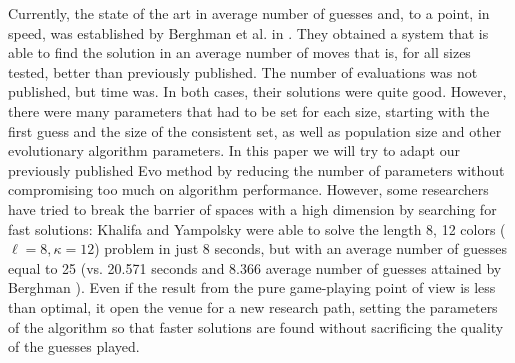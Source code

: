 \documentclass[conference]{IEEEtran}
\begin{document}
Currently, the state of the art in average number of guesses and, to a
point, in speed,
was established by Berghman et al. in \cite{Berghman20091880}. They obtained a system that is able to find the solution in an average number of moves that is, for all sizes tested, better than previously published. The number of evaluations was not published, but time was. In both cases, their solutions were
quite good. However, there were many parameters that had to be set for
each size, starting with the first guess and the size of the
consistent set, as well as population size and other evolutionary
algorithm parameters. In this paper we will try to adapt our
previously published Evo method \cite{DBLP:conf/evoW/GuervosCM11}
by reducing the number of parameters without compromising too much on algorithm performance. However, some researchers have tried to break the barrier of spaces with a high dimension by searching for fast solutions: Khalifa and Yampolsky
\cite{khalifa2011ga} were able to solve the length 8, 12 colors
($\ell=8,\kappa=12$) problem in just 8 seconds, but with an average
number of guesses equal to 25 (vs. 20.571 seconds and 8.366 average
number of guesses attained by Berghman \cite{Berghman20091880}). 
Even if the result from the pure game-playing point of view is less than optimal, it open the venue for a new research path, setting the parameters of the algorithm so that faster solutions are found without sacrificing the quality of the guesses played.
\end{document}
